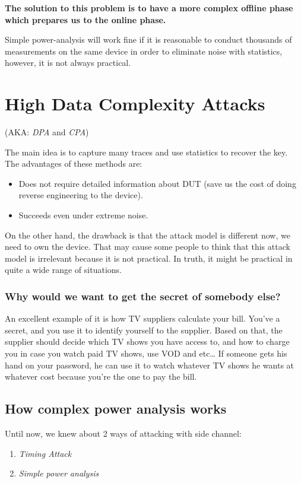 \textbf{The solution to this problem is to have a more complex offline phase which prepares us to the online phase.}

Simple power-analysis will work fine if it is reasonable to conduct thousands of measurements on the same device in order to eliminate noise with statistics, however, it is not always practical.

\section{High Data Complexity Attacks}

(AKA: \textit{DPA} and \textit{CPA})

The main idea is to capture many traces and use statistics to recover the key.
The advantages of these methods are:
\begin{itemize}
    \item Does not require detailed information about DUT (save us the cost of doing reverse engineering to the device).
    \item Succeeds even under extreme noise.
\end{itemize}

On the other hand, the drawback is that the attack model is different now, we need to own the device. 
That may cause some people to think that this attack model is irrelevant because it is not practical. 
In truth, it might be practical in quite a wide range of situations.


\subsubsection{Why would we want to get the secret of somebody else?}

An excellent example of it is how TV suppliers calculate your bill. 
You've a secret, and you use it to identify yourself to the supplier. 
Based on that, the supplier should decide which TV shows you have access to, and how to charge you in case you watch paid TV shows, use VOD and etc\ldots 
If someone gets his hand on your password, he can use it to watch whatever TV shows he wants at whatever cost because you're the one to pay the bill.


\subsection{How complex power analysis works}

Until now, we knew about 2 ways of attacking with side channel:
\begin{enumerate}
    \item \textit{Timing Attack}
    \item \textit{Simple power analysis}
\end{enumerate}

